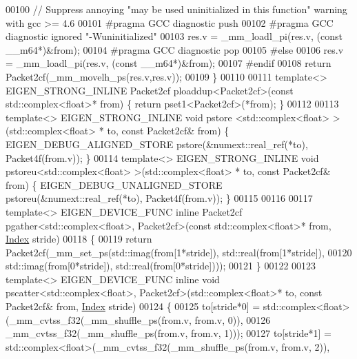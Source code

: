 \begin{DoxyCode}
00100   \textcolor{comment}{// Suppress annoying "may be used uninitialized in this function" warning with gcc >= 4.6}
00101 \textcolor{preprocessor}{  #pragma GCC diagnostic push}
00102 \textcolor{preprocessor}{  #pragma GCC diagnostic ignored "-Wuninitialized"}
00103   res.v = \_mm\_loadl\_pi(res.v, (\textcolor{keyword}{const} \_\_m64*)&from);
00104 \textcolor{preprocessor}{  #pragma GCC diagnostic pop}
00105 \textcolor{preprocessor}{#else}
00106   res.v = \_mm\_loadl\_pi(res.v, (\textcolor{keyword}{const} \_\_m64*)&from);
00107 \textcolor{preprocessor}{#endif}
00108   \textcolor{keywordflow}{return} Packet2cf(\_mm\_movelh\_ps(res.v,res.v));
00109 \}
00110 
00111 \textcolor{keyword}{template}<> EIGEN\_STRONG\_INLINE Packet2cf ploaddup<Packet2cf>(\textcolor{keyword}{const} std::complex<float>* from) \{ \textcolor{keywordflow}{return} 
      pset1<Packet2cf>(*from); \}
00112 
00113 \textcolor{keyword}{template}<> EIGEN\_STRONG\_INLINE \textcolor{keywordtype}{void} pstore <std::complex<float> >(std::complex<float> *   to, \textcolor{keyword}{const} 
      Packet2cf& from) \{ EIGEN\_DEBUG\_ALIGNED\_STORE pstore(&numext::real\_ref(*to), Packet4f(from.v)); \}
00114 \textcolor{keyword}{template}<> EIGEN\_STRONG\_INLINE \textcolor{keywordtype}{void} pstoreu<std::complex<float> >(std::complex<float> *   to, \textcolor{keyword}{const} 
      Packet2cf& from) \{ EIGEN\_DEBUG\_UNALIGNED\_STORE pstoreu(&numext::real\_ref(*to), Packet4f(from.v)); \}
00115 
00116 
00117 \textcolor{keyword}{template}<> EIGEN\_DEVICE\_FUNC \textcolor{keyword}{inline} Packet2cf pgather<std::complex<float>, Packet2cf>(\textcolor{keyword}{const} 
      std::complex<float>* from, \hyperlink{namespace_eigen_a62e77e0933482dafde8fe197d9a2cfde}{Index} stride)
00118 \{
00119   \textcolor{keywordflow}{return} Packet2cf(\_mm\_set\_ps(std::imag(from[1*stride]), std::real(from[1*stride]),
00120                               std::imag(from[0*stride]), std::real(from[0*stride])));
00121 \}
00122 
00123 \textcolor{keyword}{template}<> EIGEN\_DEVICE\_FUNC \textcolor{keyword}{inline} \textcolor{keywordtype}{void} pscatter<std::complex<float>, Packet2cf>(std::complex<float>* to, \textcolor{keyword}{
      const} Packet2cf& from, \hyperlink{namespace_eigen_a62e77e0933482dafde8fe197d9a2cfde}{Index} stride)
00124 \{
00125   to[stride*0] = std::complex<float>(\_mm\_cvtss\_f32(\_mm\_shuffle\_ps(from.v, from.v, 0)),
00126                                      \_mm\_cvtss\_f32(\_mm\_shuffle\_ps(from.v, from.v, 1)));
00127   to[stride*1] = std::complex<float>(\_mm\_cvtss\_f32(\_mm\_shuffle\_ps(from.v, from.v, 2)),

\end{DoxyCode}
